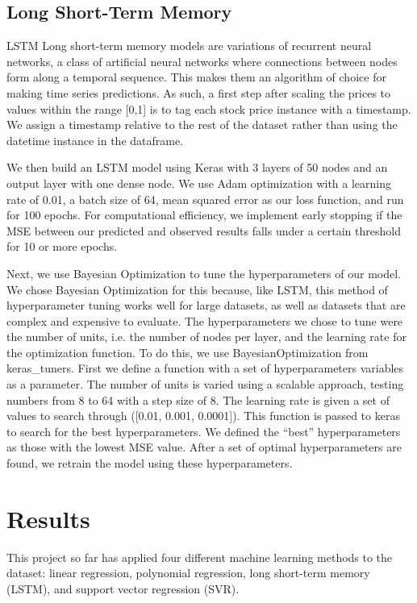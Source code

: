 \documentclass[12pt,a4paper]{article}
\begin{document}
\subsection{Long Short-Term Memory}
LSTM
Long short-term memory models are variations of recurrent neural networks, a class of artificial neural networks where connections between nodes form along a temporal sequence. This makes them an algorithm of choice for making time series predictions. As such, a first step after scaling the prices to values within the range [0,1] is to tag each stock price instance with a timestamp. We assign a timestamp relative to the rest of the dataset rather than using the datetime instance in the dataframe.

We then build an LSTM model using Keras with 3 layers of 50 nodes and an output layer with one dense node. We use Adam optimization with a learning rate of 0.01, a batch size of 64, mean squared error as our loss function, and run for 100 epochs. For computational efficiency, we implement early stopping if the MSE between our predicted and observed results falls under a certain threshold for 10 or more epochs.

Next, we use Bayesian Optimization to tune the hyperparameters of our model. We chose Bayesian Optimization for this because, like LSTM, this method of hyperparameter tuning works well for large datasets, as well as datasets that are complex and expensive to evaluate. The hyperparameters we chose to tune were the number of units, i.e. the number of nodes per layer, and the learning rate for the optimization function. To do this, we use BayesianOptimization from keras_tuners. First we define a function with a set of hyperparameters variables as a parameter. The number of units is varied using a scalable approach, testing numbers from 8 to 64 with a step size of 8. The learning rate is given a set of values to search through ([0.01, 0.001, 0.0001]). This function is passed to keras to search for the best hyperparameters. We defined the “best” hyperparameters as those with the lowest MSE value. After a set of optimal hyperparameters are found, we retrain the model using these hyperparameters. 



\section{Results}
This project so far has applied four different machine learning methods to the dataset: linear regression, polynomial regression, long short-term memory (LSTM), and support vector regression (SVR).
\end{document}
